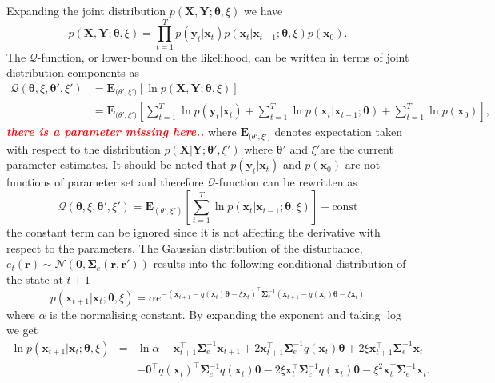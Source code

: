 \documentclass[]{article}
\newcommand{\dean}[1]{\textsf{\emph{\textbf{\textcolor{red}{#1}}}}}
\begin{document}
Expanding the joint distribution $p(\mathbf X,\mathbf Y;\boldsymbol \theta,\xi)$ we have
\begin{equation}\label{eq:jointdistribution}
 p(\mathbf X,\mathbf Y;\boldsymbol \theta,\xi)=\prod_{t=1}^{T} p(\mathbf y_t|\mathbf x_t)p(\mathbf x_t|\mathbf x_{t-1};\boldsymbol \theta, \xi)p(\mathbf x_0).
\end{equation}
The $\mathcal Q$-function, or lower-bound on the likelihood, can be written in terms of joint distribution components as
\begin{align}
 \mathcal Q(\boldsymbol \theta,\xi,\boldsymbol\theta',\xi')&=\mathbf E_{\boldsymbol (\theta',\xi')}\left[\ln p(\mathbf X,\mathbf Y;\boldsymbol \theta,\xi)\right] \\
&=\mathbf E_{\boldsymbol (\theta',\xi')}\left[\sum_{t=1}^{T}\ln p(\mathbf y_t|\mathbf x_t)+\sum_{t=1}^{T}\ln p(\mathbf x_t|\mathbf x_{t-1};\boldsymbol \theta)+\sum_{t=1}^{T}\ln p(\mathbf x_0)\right],
\end{align}
\dean{there is a parameter missing here..} where $ \mathbf E_{\boldsymbol (\theta',\xi')}$ denotes expectation taken with respect to the distribution $p(\mathbf X | \mathbf Y;\boldsymbol \theta',\xi') $ where $\boldsymbol \theta'$ and $\xi'$are the current parameter estimates. It should be noted that
$p(\mathbf y_t|\mathbf x_t)$ and $p(\mathbf x_0)$ are not functions of parameter set and therefore $\mathcal Q$-function can be rewritten as
\begin{equation}
\mathcal Q(\boldsymbol \theta,\xi,\boldsymbol\theta',\xi')=\mathbf E_{(\theta',\xi')}\left[\sum_{t=1}^{T}\ln p(\mathbf x_t|\mathbf x_{t-1};\boldsymbol \theta ,\xi)\right]+\mathrm{const}
\end{equation}
the constant term can be ignored since it is not affecting the derivative with respect to the parameters. 
The Gaussian distribution of the disturbance, $e_t(\mathbf r)\sim \mathcal N(\mathbf 0,\boldsymbol\Sigma_e(\mathbf r,\mathbf r'))$ results into the following conditional distribution of the state at $t+1$
\begin{equation}
 p(\mathbf x_{t+1} | \mathbf x_t;\boldsymbol\theta,\xi)=\alpha e^{-(\mathbf x_{t+1}-q(\mathbf  x_t)\boldsymbol\theta-\xi  \mathbf x_t)^\top\boldsymbol\Sigma_e^{-1}(\mathbf x_{t+1}-q( \mathbf x_t)\boldsymbol\theta-\xi \mathbf  x_t)}
\end{equation}
where $\alpha$ is the normalising constant. By expanding the exponent and taking $\log$ we get
\begin{eqnarray}\label{eq:Qfunction}
  \ln p(\mathbf x_{t+1} | \mathbf x_t;\boldsymbol\theta,\xi)&=&\ln \alpha-\mathbf x_{t+1}^\top\boldsymbol\Sigma_e^{-1}\mathbf x_{t+1}+2\mathbf x_{t+1}^\top\boldsymbol\Sigma_e^{-1}q( \mathbf x_t)\boldsymbol\theta+2\xi \mathbf x_{t+1}^\top\boldsymbol\Sigma_e^{-1}\mathbf x_t\nonumber \\
&&-\boldsymbol\theta^\top q(\mathbf x_t)^\top\boldsymbol\Sigma_e^{-1}q(\mathbf x_t)\boldsymbol\theta-2\xi \mathbf x_t^\top\boldsymbol\Sigma_e^{-1}q(\mathbf x_t)\boldsymbol\theta-\xi^2\mathbf x_t^\top\boldsymbol\Sigma_e^{-1}\mathbf x_t.
\end{eqnarray}
\end{document}

